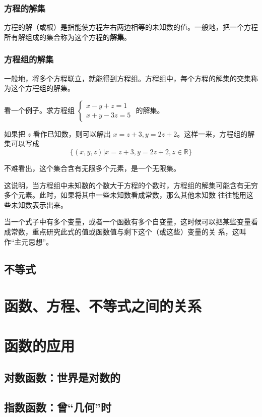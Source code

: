 \documentclass[a4paper,openany]{ctexbook}
\begin{document}
\subsubsection{方程的解集}

方程的解（或根）是指能使方程左右两边相等的未知数的值。一般地，把一个方程所有解组成的集合称为这个方程的\textbf{解集}。

\subsubsection{方程组的解集}

一般地，将多个方程联立，就能得到方程组。方程组中，每个方程的解集的交集称为这个方程组的解集。

看一个例子。求方程组 \(\begin{cases}
    x-y+z=1 \\
    x+y-3z=5
\end{cases}\) 的解集。

如果把 \(z\) 看作已知数，则可以解出 \(x=z+3,y=2z+2\)。这样一来，方程组的解集可以写成
\[
    \{(x,y,z)|x=z+3,y=2z+2,z\in \mathbb{R} \}
\]

不难看出，这个集合含有无限多个元素，是一个无限集。

这说明，当方程组中未知数的个数大于方程的个数时，方程组的解集可能含有无穷多个元素。此时，如果将其中一些未知数看成常数，那么其他未知数
往往能用这些未知数表示出来。

当一个式子中有多个变量，或者一个函数有多个自变量，这时候可以把某些变量看成常数，重点研究此式的值或函数值与剩下这个（或这些）变量的关
系，这叫作“主元思想”。

\subsection{不等式}

\section{函数、方程、不等式之间的关系}

\section{函数的应用}

\subsection{对数函数：世界是对数的}

\subsection{指数函数：曾“几何”时}
\end{document}
